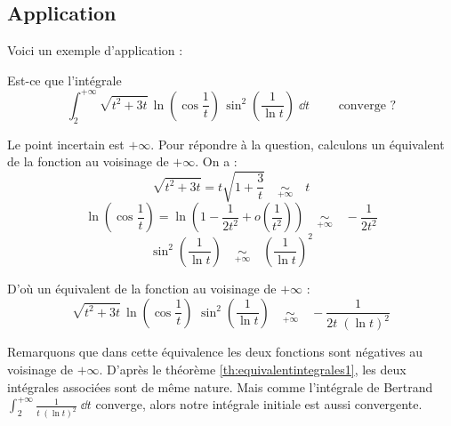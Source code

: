 \documentclass[class=report,crop=false]{standalone}
\begin{document}
\subsection{Application}

Voici un exemple d'application :
\begin{exemple}
Est-ce que l'intégrale 
$$
\int_2^{+\infty} 
\sqrt{t^2+3t}\,\ln\left(\cos\frac{1}{t}\right)
\,\sin^2\left(\frac{1}{\ln t}\right)\;\dd t\qquad \text{ converge ?}
$$

Le point incertain est $+\infty$. Pour répondre à la question, calculons un équivalent de la fonction au voisinage de $+\infty$.
On a :
$$\sqrt{t^2+3t} = t\sqrt{1+\frac{3}{t}} \quad  \underset{+\infty}{\sim}\quad   t$$
$$\ln\left(\cos\frac{1}{t}\right) = 
\ln\left(1-\frac{1}{2t^2}+o\left(\frac{1}{t^2}\right)\right)
\quad \underset{+\infty}{\sim}\quad  -\frac{1}{2t^2}$$
$$\sin^2\left(\frac{1}{\ln t}\right) 
\quad\underset{+\infty}{\sim}\quad \left(\frac{1}{\ln t}\right)^2$$

D'où un équivalent de la fonction au voisinage de
$+\infty$ : 
$$\sqrt{t^2+3t}\,\ln\left(\cos\frac{1}{t}\right)\,
\,\sin^2\left(\frac{1}{\ln t}\right)
\quad \underset{+\infty}{\sim}\quad  -\frac{1}{2t\;(\ln t)^2}$$

Remarquons que dans cette équivalence les deux fonctions sont négatives 
au voisinage de $+\infty$. 
D'après le théorème \ref{th:equivalentintegrales1},
les deux intégrales associées sont de même nature.
Mais comme l'intégrale de Bertrand 
$\int_2^{+\infty} \frac{1}{t\;(\ln t)^2}\;\dd t$ converge, 
alors notre intégrale initiale est aussi convergente.
\end{exemple}



\end{document}
